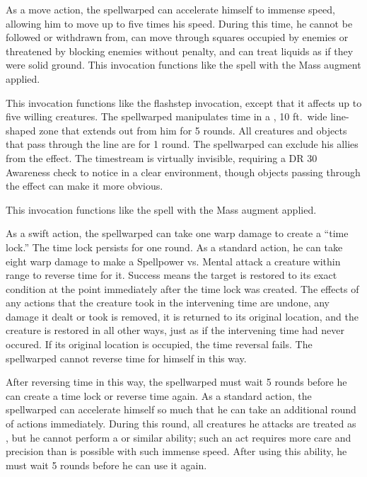             As a move action, the spellwarped can accelerate himself to immense speed, allowing him to move up to five times his speed.
            During this time, he cannot be followed or withdrawn from, can move through squares occupied by enemies or threatened by blocking enemies without penalty, and can treat liquids as if they were solid ground.
            This invocation functions like the  spell with the Mass augment applied.

            This invocation functions like the flashstep invocation, except that it affects up to five willing creatures.
            The spellwarped manipulates time in a \arealarge, 10 ft.\ wide line-shaped zone that extends out from him for 5 rounds.
            All creatures and objects that pass through the line are \slowed for 1 round.
            The spellwarped can exclude his allies from the effect.
            The timestream is virtually invisible, requiring a DR 30 Awareness check to notice in a clear environment, though objects passing through the effect can make it more obvious.

            This invocation functions like the  spell with the Mass augment applied.

            As a swift action, the spellwarped can take one warp damage to create a ``time lock.'' The time lock persists for one round.
            As a standard action, he can take eight warp damage to make a Spellpower vs. Mental attack a creature within \rngmed range to reverse time for it.
            Success means the target is restored to its exact condition at the point immediately after the time lock was created.
            The effects of any actions that the creature took in the intervening time are undone, any damage it dealt or took is removed, it is returned to its original location, and the creature is restored in all other ways, just as if the intervening time had never occured.
            If its original location is occupied, the time reversal fails.
            The spellwarped cannot reverse time for himself in this way.
            \par After reversing time in this way, the spellwarped must wait 5 rounds before he can create a time lock or reverse time again.
            As a standard action, the spellwarped can accelerate himself so much that he can take an additional round of actions immediately.
            During this round, all creatures he attacks are treated as \helpless, but he cannot perform a  or similar ability; such an act requires more care and precision than is possible with such immense speed.
            After using this ability, he must wait 5 rounds before he can use it again.

